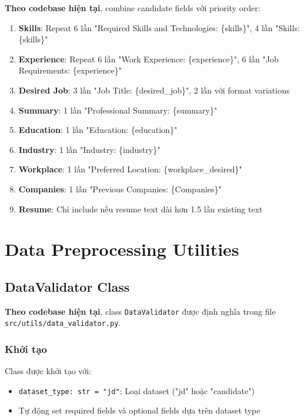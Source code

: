 \textbf{Theo codebase hiện tại}, combine candidate fields với priority order:
\begin{enumerate}
    \item \textbf{Skills}: Repeat 6 lần "Required Skills and Technologies: \{skills\}", 4 lần "Skills: \{skills\}"
    \item \textbf{Experience}: Repeat 6 lần "Work Experience: \{experience\}", 6 lần "Job Requirements: \{experience\}"
    \item \textbf{Desired Job}: 3 lần "Job Title: \{desired\_job\}", 2 lần với format variations
    \item \textbf{Summary}: 1 lần "Professional Summary: \{summary\}"
    \item \textbf{Education}: 1 lần "Education: \{education\}"
    \item \textbf{Industry}: 1 lần "Industry: \{industry\}"
    \item \textbf{Workplace}: 1 lần "Preferred Location: \{workplace\_desired\}"
    \item \textbf{Companies}: 1 lần "Previous Companies: \{Companies\}"
    \item \textbf{Resume}: Chỉ include nếu resume text dài hơn 1.5 lần existing text
\end{enumerate}

\section{Data Preprocessing Utilities}

\subsection{DataValidator Class}

\textbf{Theo codebase hiện tại}, class \texttt{DataValidator} được định nghĩa trong file \texttt{src/utils/data\_validator.py}.

\subsubsection{Khởi tạo}

Class được khởi tạo với:
\begin{itemize}
    \item \texttt{dataset\_type: str = "jd"}: Loại dataset ("jd" hoặc "candidate")
    \item Tự động set required fields và optional fields dựa trên dataset type
\end{itemize}

